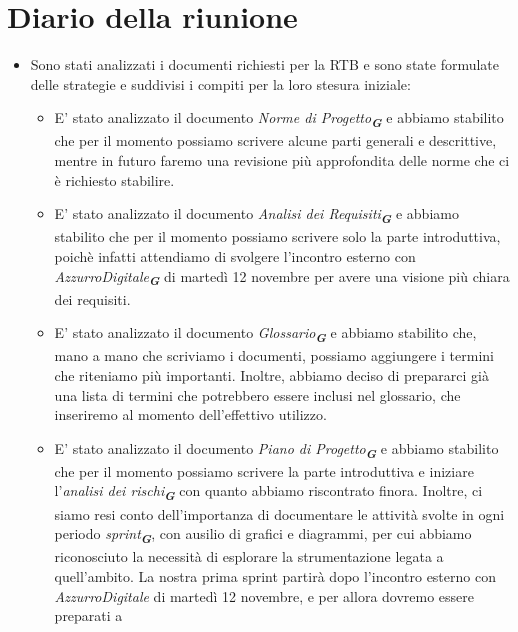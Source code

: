

\section{Diario della riunione}

\begin{itemize}
    \item Sono stati analizzati i documenti richiesti per la RTB e sono state formulate delle strategie e suddivisi i compiti per la loro stesura iniziale:
    \begin{itemize}
        \item E' stato analizzato il documento \emph{Norme di Progetto}\textsubscript{\textit{\textbf{G}}} e abbiamo stabilito che per il momento possiamo 
        scrivere alcune parti generali e descrittive, mentre in futuro faremo una revisione più approfondita delle norme che ci è richiesto stabilire.
        \item E' stato analizzato il documento \emph{Analisi dei Requisiti}\textsubscript{\textit{\textbf{G}}} e abbiamo stabilito che per il momento 
        possiamo scrivere solo la parte introduttiva, poichè infatti attendiamo di svolgere l'incontro esterno con 
        \emph{AzzurroDigitale}\textsubscript{\textit{\textbf{G}}} di martedì 12 novembre per avere una visione più chiara dei requisiti.
        \item E' stato analizzato il documento \emph{Glossario}\textsubscript{\textit{\textbf{G}}} e abbiamo stabilito che, mano a mano che scriviamo i 
        documenti, possiamo aggiungere i termini che riteniamo più importanti. Inoltre, abbiamo deciso di prepararci già una lista di termini che potrebbero 
        essere inclusi nel glossario, che inseriremo al momento dell'effettivo utilizzo.
        \item E' stato analizzato il documento \emph{Piano di Progetto}\textsubscript{\textit{\textbf{G}}} e abbiamo stabilito che per il momento possiamo 
        scrivere la parte introduttiva e iniziare l'\emph{analisi dei rischi}\textsubscript{\textit{\textbf{G}}} con quanto abbiamo riscontrato finora. 
        Inoltre, ci siamo resi conto dell'importanza di documentare le attività svolte in ogni periodo \emph{sprint}\textsubscript{\textit{\textbf{G}}}, 
        con ausilio di grafici e diagrammi, per cui abbiamo riconosciuto la necessità di esplorare la strumentazione legata a quell'ambito.
        La nostra prima sprint partirà dopo l'incontro esterno con \emph{AzzurroDigitale} di martedì 12 novembre, e per allora dovremo essere preparati a

\end{itemize}
\end{itemize}
